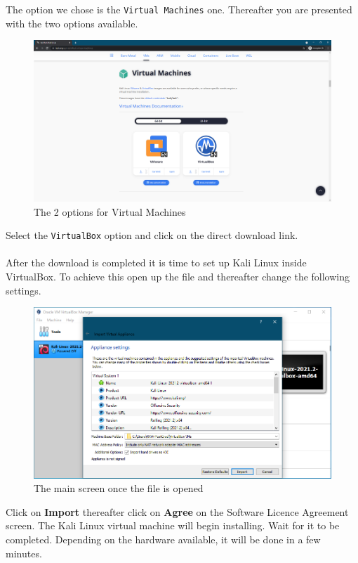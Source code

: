 \documentclass[a4paper, 12pt, titlepage]{report}
\begin{document}
The option we chose is the \texttt{Virtual Machines} one. Thereafter you are presented with the two options available.
\begin{figure}[H]
    \centering
    \includegraphics[scale=0.5]{pics/kalivb.PNG}
    \caption{The 2 options for Virtual Machines}
\end{figure}
Select the \texttt{VirtualBox} option and click on the direct download link.\\\\
After the download is completed it is time to set up Kali Linux inside VirtualBox. To achieve this open up the file and thereafter change the following settings.
\begin{figure}[H]
    \centering
    \includegraphics[scale=0.5]{pics/vbkali1.PNG}
    \caption{The main screen once the file is opened}
\end{figure}
Click on \textbf{Import} thereafter click on \textbf{Agree} on the Software Licence Agreement screen. The Kali Linux virtual machine will begin installing. Wait for it to be completed. Depending on the hardware available, it will be done in a few minutes.
\end{document}
